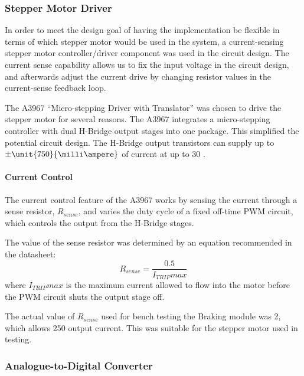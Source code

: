 \subsubsection{Stepper Motor Driver}

In order to meet the design goal of having the implementation be flexible in terms of which stepper motor would be used in the system, a current-sensing stepper motor controller/driver component was used in the circuit design. The current sense capability allows us to fix the input voltage in the circuit design, and afterwards adjust the current drive by changing resistor values in the current-sense feedback loop. 

The A3967 ``Micro-stepping Driver with Translator'' was chosen to drive the stepper motor for several reasons. The A3967 integrates a micro-stepping controller with dual H-Bridge output stages into one package. This simplified the potential circuit design. The H-Bridge output transistors can supply up to $\pm\unit{750}{\milli\ampere}$ of current at up to \unit{30}{\volt} \cite{A3967}. 

\paragraph{Current Control}

The current control feature of the A3967 works by sensing the current through a sense resistor, $R_{sense}$, and varies the duty cycle of a fixed off-time PWM circuit, which controls the output from the H-Bridge stages.

The value of the sense resistor was determined by an equation recommended in the datasheet:
\begin{equation}
R_{sense}=\frac{0.5}{I_{TRIP}max}
\end{equation}
where $I_{TRIP}max$ is the maximum current allowed to flow into the motor before the PWM circuit shuts the output stage off.

The actual value of $R_{sense}$ used for bench testing the Braking module was \unit{2}{\ohm}, which allows \unit{250}{\milli\ampere} output current. This was suitable for the stepper motor used in testing.

\subsubsection{Analogue-to-Digital Converter}

